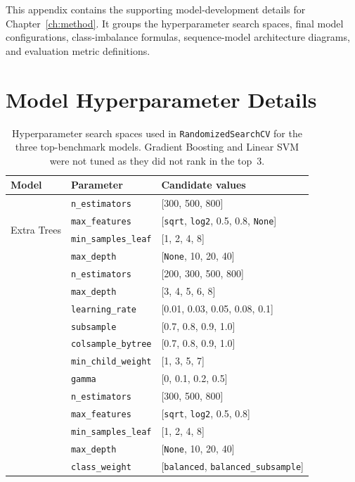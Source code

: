 
This appendix contains the supporting model-development details for
Chapter~\ref{ch:method}. It groups the hyperparameter search spaces,
final model configurations, class-imbalance formulas, sequence-model
architecture diagrams, and evaluation metric definitions.


\section{Model Hyperparameter Details}

\begin{table}[H]
\centering
\caption{Hyperparameter search spaces used in \texttt{RandomizedSearchCV}
for the three top-benchmark models. Gradient Boosting and Linear SVM
were not tuned as they did not rank in the top~3.}
\label{tab:search_spaces}
\small
\begin{tabular}{@{}lll@{}}
\toprule
\textbf{Model} & \textbf{Parameter} & \textbf{Candidate values} \\
\midrule

\multirow{4}{*}{Extra Trees}
  & \texttt{n\_estimators}      & [300, 500, 800] \\
  & \texttt{max\_features}      & [\texttt{sqrt}, \texttt{log2}, 0.5, 0.8, \texttt{None}] \\
  & \texttt{min\_samples\_leaf} & [1, 2, 4, 8] \\
  & \texttt{max\_depth}         & [\texttt{None}, 10, 20, 40] \\
\addlinespace

\multirow{7}{*}{XGBoost}
  & \texttt{n\_estimators}      & [200, 300, 500, 800] \\
  & \texttt{max\_depth}         & [3, 4, 5, 6, 8] \\
  & \texttt{learning\_rate}     & [0.01, 0.03, 0.05, 0.08, 0.1] \\
  & \texttt{subsample}          & [0.7, 0.8, 0.9, 1.0] \\
  & \texttt{colsample\_bytree}  & [0.7, 0.8, 0.9, 1.0] \\
  & \texttt{min\_child\_weight} & [1, 3, 5, 7] \\
  & \texttt{gamma}              & [0, 0.1, 0.2, 0.5] \\
\addlinespace

\multirow{5}{*}{Random Forest}
  & \texttt{n\_estimators}      & [300, 500, 800] \\
  & \texttt{max\_features}      & [\texttt{sqrt}, \texttt{log2}, 0.5, 0.8] \\
  & \texttt{min\_samples\_leaf} & [1, 2, 4, 8] \\
  & \texttt{max\_depth}         & [\texttt{None}, 10, 20, 40] \\
  & \texttt{class\_weight}      & [\texttt{balanced}, \texttt{balanced\_subsample}] \\

\bottomrule
\end{tabular}
\normalsize
\end{table}

